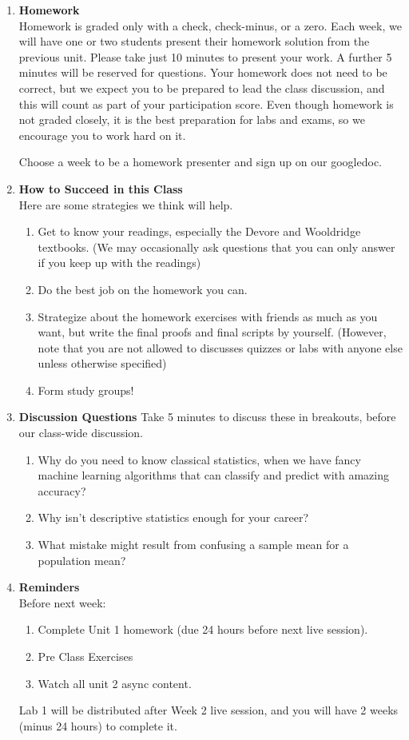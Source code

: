 \documentclass[12pt,a4paper]{article}
\numberwithin{equation}{subsection}
\begin{document}
\begin{enumerate}
\item \textbf{Homework}\\
Homework is graded only with a check, check-minus, or a zero.
Each week, we will have one or two students present their homework solution from the previous unit.
Please take just 10 minutes to present your work.  A further 5 minutes will be reserved for questions.  Your homework does not need to be correct, but we expect you to be prepared to lead the class discussion, and this will count as part of your participation score.  Even though homework is not graded closely, it is the best preparation for labs and exams, so we encourage you to work hard on it.

Choose a week to be a homework presenter and sign up on our googledoc.

\item \textbf{How to Succeed in this Class}\\
Here are some strategies we think will help.
\begin{enumerate}
\item Get to know your readings, especially the Devore and Wooldridge textbooks.  (We may occasionally ask questions that you can only answer if you keep up with the readings)
\item Do the best job on the homework you can.
\item Strategize about the homework exercises with friends as much as you want, but write the final proofs and final scripts by yourself.  (However, note that you are not allowed to discusses quizzes or labs with anyone else unless otherwise specified)
\item Form study groups!
\end{enumerate}

\item \textbf{Discussion Questions}
Take 5 minutes to discuss these in breakouts, before our class-wide discussion.
\begin{enumerate}
\item Why do you need to know classical statistics, when we have fancy machine learning algorithms that can classify and predict with amazing accuracy?
\item Why isn't descriptive statistics enough for your career?
\item What mistake might result from confusing a sample mean for a population mean?
\end{enumerate}

\item \textbf{Reminders}\\
Before next week:
\begin{enumerate}
\item Complete Unit 1 homework (due 24 hours before next live session).
\item Pre Class Exercises
\item Watch all unit 2 async content.
\end{enumerate}
Lab 1 will be distributed after Week 2 live session, and you will have 2 weeks (minus 24 hours) to complete it.

\end{enumerate}
\end{document}
